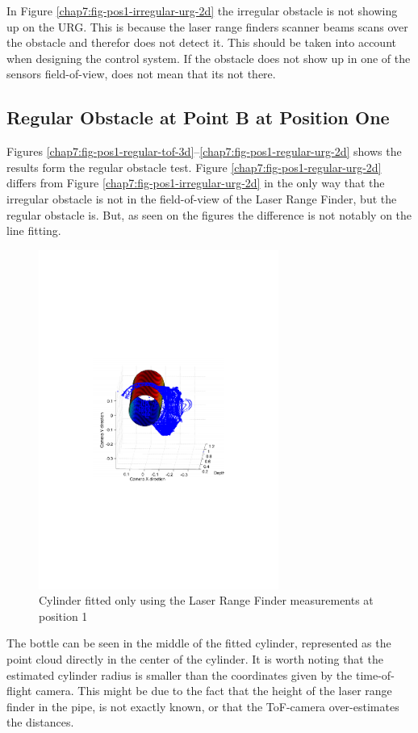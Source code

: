 In Figure \ref{chap7:fig-pos1-irregular-urg-2d} the irregular obstacle is not showing up
on the URG. This is because the laser range finders scanner beams scans over the obstacle
and therefor does not detect it. This should be taken into account when designing the
control system. If the obstacle does not show up in one of the sensors field-of-view, does
not mean that its not there. 


\subsection{Regular Obstacle at Point B at Position One}
Figures \ref{chap7:fig-pos1-regular-tof-3d}--\ref{chap7:fig-pos1-regular-urg-2d} shows the
results form the regular obstacle test. Figure \ref{chap7:fig-pos1-regular-urg-2d} differs
from Figure \ref{chap7:fig-pos1-irregular-urg-2d} in the only way that the irregular
obstacle is not in the field-of-view of the Laser Range Finder, but the regular obstacle
is. But, as seen on the figures the difference is not notably on the line fitting.
\begin{figure}[htbp]
    \centering
    \includegraphics[width=0.7\textwidth]{pics/pos1-regular-urg-3d}
    \caption{Cylinder fitted only using the Laser Range Finder measurements at position 1}
    \label{chap7:fig-pos1-regular-urg-3d}
\end{figure}
The bottle can be seen in the middle of the fitted cylinder, represented as the point
cloud directly in the center of the cylinder. It is worth noting that the estimated
cylinder radius is smaller than the coordinates given by the time-of-flight camera. This
might be due to the fact that the height of the laser range finder in the pipe, is not
exactly known, or that the ToF-camera over-estimates the distances. 

